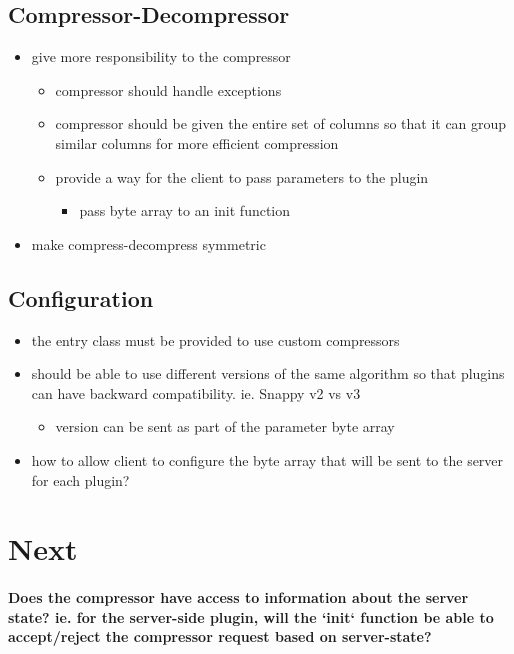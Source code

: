 \documentclass[11pt,a4paper]{article}
\begin{document}
	\subsection*{Compressor-Decompressor}
	\begin{itemize}
		\item give more responsibility to the compressor
		\begin{itemize}
			\item compressor should handle exceptions
			\item compressor should be given the entire set of columns so that it can group similar columns for more efficient compression
			\item provide a way for the client to pass parameters to the plugin
			\begin{itemize}
				\item pass byte array to an init function
			\end{itemize}
		\end{itemize}
		\item make compress-decompress symmetric
	\end{itemize}
	
	\subsection*{Configuration}
	
	\begin{itemize}
		\item the entry class must be provided to use custom compressors
		\item should be able to use different versions of the same algorithm so that plugins can have backward compatibility. ie. Snappy v2 vs v3
		\begin{itemize}
			\item version can be sent as part of the parameter byte array
		\end{itemize}
		\item how to allow client to configure the byte array that will be sent to the server for each plugin?
	\end{itemize}
	
\section*{Next}
	
	\paragraph{Does the compressor have access to information about the server state? ie. for the server-side plugin, will the `init` function be able to accept/reject the compressor request based on server-state?}
	
\end{document}
